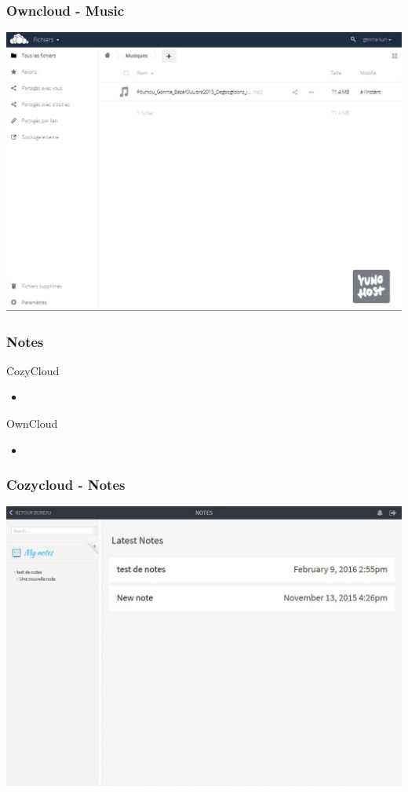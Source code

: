 \documentclass{beamer}
\begin{document}
\begin{frame}
\frametitle{Owncloud - Music}
\includegraphics[scale=0.3] {./Owncloud/Owncloud_Musiques.jpg}
\end{frame}

\begin{frame}
\frametitle{Notes}

\begin{block}{CozyCloud}
\begin{itemize}
\item 
\end{itemize}
\end{block}

\begin{block}{OwnCloud}
\begin{itemize}
\item 
\end{itemize}
\end{block}
\end{frame}


\begin{frame}
\frametitle{Cozycloud - Notes}
\includegraphics[scale=0.3] {./CozyCloud/CozyCloud_Notes.jpg}
\end{frame}
\end{document}
